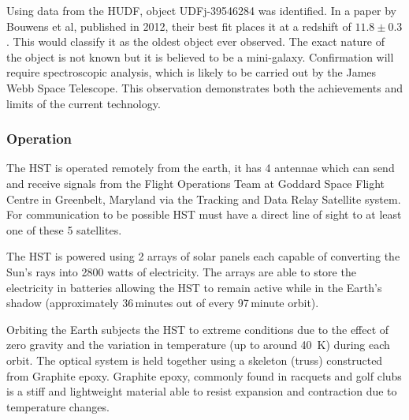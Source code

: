 		Using data from the HUDF, object UDFj-39546284 was identified. In a paper by Bouwens et al, published in 2012, their best fit places it at a redshift of $11.8\pm0.3$\cite{Bouwens2012}. This would classify it as the oldest object ever observed. The exact nature of the object is not known but it is believed to be a mini-galaxy. Confirmation will require spectroscopic analysis, which is likely to be carried out by the James Webb Space Telescope. This observation demonstrates both the achievements and limits of the current technology.

	\subsubsection{Operation} %
	\label{ssub:operation}
		The HST is operated remotely from the earth, it has 4 antennae which can send and receive signals from the Flight Operations Team at Goddard Space Flight Centre in Greenbelt, Maryland via the Tracking and Data Relay Satellite system. For communication to be possible HST must have a direct line of sight to at least one of these 5 satellites.

		The HST is powered using 2 arrays of solar panels each capable of converting the Sun’s rays into \num{2800} watts of electricity. The arrays are able to store the electricity in batteries allowing the HST to remain active while in the Earth’s shadow (approximately 36\,minutes out of every 97\,minute orbit).

		Orbiting the Earth subjects the HST to extreme conditions due to the effect of zero gravity and the variation in temperature (up to around \SI{40}{\kelvin}) during each orbit. The optical system is held together using a skeleton (truss) constructed from Graphite epoxy. Graphite epoxy, commonly found in racquets and golf clubs is a stiff and lightweight material able to resist expansion and contraction due to temperature changes\cite{Hubsite_4}.

